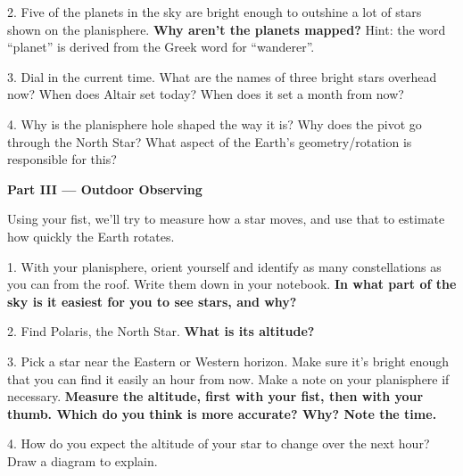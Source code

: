 \documentclass[10pt]{article}%
\begin{document}
\begin{flushleft}
\vspace{.1in} 

2. Five of the planets in the sky are bright enough to outshine a lot of stars
shown on the planisphere. \textbf{Why aren't the planets mapped?} Hint: the
word ``planet'' is derived from the Greek word for ``wanderer''.

\vspace{.1in} 

3. Dial in the current time. What are the names of three bright stars overhead
now? When does Altair set today? When does it set a month from now?

\vspace{.1in} 

4. Why is the planisphere hole shaped the way it is?  Why does the pivot go through the North Star?  What aspect of the Earth's geometry/rotation is responsible for this?

\vspace{0.1in}

\large{\textbf{Part III --- Outdoor Observing}}


\vspace{0.1in} 

Using your fist, we'll try to measure how a star moves, and use that to estimate how quickly the Earth rotates. 

\vspace{0.1in} 

1. With your planisphere, orient yourself and identify as many constellations
as you can from the roof.  Write them down in your notebook.  \textbf{In what part of the sky is it easiest for you to see stars, and why?}

\vspace{0.1in} 

2. Find Polaris, the North Star. \textbf{What is its altitude?}

\vspace{0.1in} 

3. Pick a star near the Eastern or Western horizon.  Make sure it's bright enough that you can find it easily an hour from now.  Make a note on your planisphere if necessary. \textbf{Measure the altitude, first with your fist, then with your thumb.  Which do you think is more accurate? Why? Note the time.}

\vspace{0.1in} 


4. How do you expect the altitude of your star to change over the next hour?
Draw a diagram to explain.


\end{flushleft}
\end{document}
